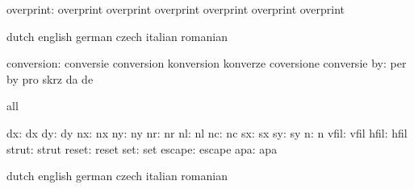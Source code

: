                 overprint: overprint                 overprint
                           overprint                 overprint
                           overprint                 overprint %


\stopconstants





\startvariables            dutch                     english
                           german                    czech
                           italian                   romanian

               conversion: conversie                 conversion
                           konversion                konverze
                           coversione                conversie
                       by: per                       by
                           pro                       skrz
                           da                        de

\stopvariables




\startconstants            all

                       dx: dx
                       dy: dy
                       nx: nx
                       ny: ny
                       nr: nr
                       nl: nl
                       nc: nc
                       sx: sx
                       sy: sy
                        n: n
                     vfil: vfil
                     hfil: hfil
                    strut: strut
                    reset: reset
                      set: set
                   escape: escape
                      apa: apa

\stopconstants




\startvariables            dutch                     english
                           german                    czech
                           italian                   romanian

